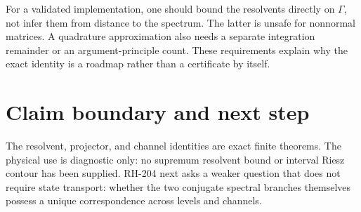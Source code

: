 \documentclass[12pt]{article}
\theoremstyle{remark}\newtheorem{remark}[theorem]{Remark}
\begin{document}
For a validated implementation, one should bound the resolvents directly on
$\Gamma$, not infer them from distance to the spectrum.  The latter is
unsafe for nonnormal matrices.  A quadrature approximation also needs a
separate integration remainder or an argument-principle count.  These
requirements explain why the exact identity is a roadmap rather than a
certificate by itself.

\section{Claim boundary and next step}

The resolvent, projector, and channel identities are exact finite theorems.
The physical use is diagnostic only: no supremum resolvent bound or interval
Riesz contour has been supplied.  RH-204 next asks a weaker question that
does not require state transport: whether the two conjugate spectral
branches themselves possess a unique correspondence across levels and
channels.


\end{document}
